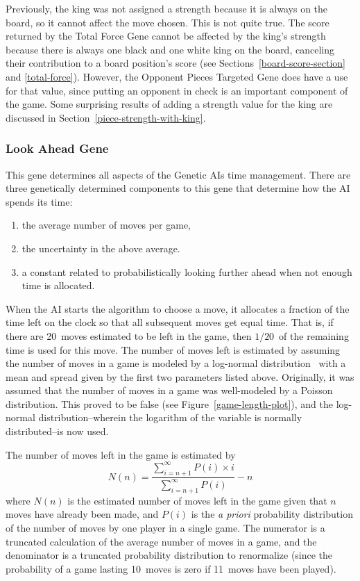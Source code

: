 \documentclass[letterpaper]{article}
\renewcommand{\_}{\allowbreak\textunderscore\allowbreak}
\begin{document}
Previously, the king was not assigned a strength because it is always on the board, so it cannot affect the move chosen. This is not quite true. The score returned by the Total Force Gene cannot be affected by the king's strength because there is always one black and one white king on the board, canceling their contribution to a board position's score (see Sections~\ref{board-score-section} and \ref{total-force}). However, the Opponent Pieces Targeted Gene does have a use for that value, since putting an opponent in check is an important component of the game. Some surprising results of adding a strength value for the king are discussed in Section~\ref{piece-strength-with-king}.

\subsubsection{Look Ahead Gene}
This gene determines all aspects of the Genetic AIs time management. There are three genetically determined components to this gene that determine how the AI spends its time:
\begin{enumerate}
	\item the average number of moves per game,
	\item the uncertainty in the above average.
	\item a constant related to probabilistically looking further ahead when not enough time is allocated.
\end{enumerate}
When the AI starts the algorithm to choose a move, it allocates a fraction of the time left on the clock so that all subsequent moves get equal time. That is, if there are 20~moves estimated to be left in the game, then \(1/20\)~of the remaining time is used for this move. The number of moves left is estimated by assuming the number of moves in a game is modeled by a log-normal distribution~\cite{log-norm-wiki}\cite{log-norm-chess-se} with a mean and spread given by the first two parameters listed above. Originally, it was assumed that the number of moves in a game was well-modeled by a Poisson distribution. This proved to be false (see Figure~\ref{game-length-plot}), and the log-normal distribution--wherein the logarithm of the variable is normally distributed--is now used.

The number of moves left in the game is estimated by
\[N(n) = \frac{\sum_{i = n + 1}^\infty P(i)\times{}i}{\sum_{i = n + 1}^\infty P(i)} - n\]
where \(N(n)\) is the estimated number of moves left in the game given that \(n\) moves have already been made, and \(P(i)\) is the \emph{a priori} probability distribution of the number of moves by one player in a single game. The numerator is a truncated calculation of the average number of moves in a game, and the denominator is a truncated probability distribution to renormalize (since the probability of a game lasting 10~moves is zero if 11~moves have been played).
\end{document}
